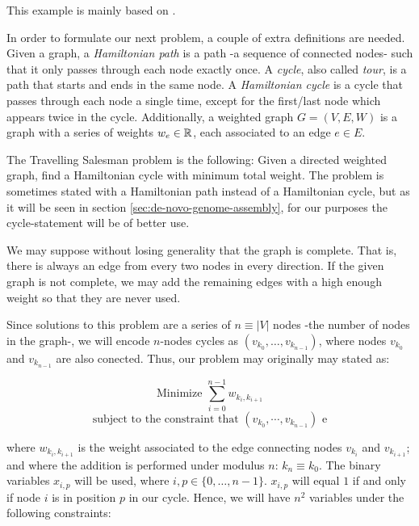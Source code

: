This example is mainly based on \cite{Glover2019}.

In order to formulate our next problem, a couple of extra definitions are needed. Given a graph, a \emph{Hamiltonian path} is a path -a sequence of connected nodes- such that it only passes through each node exactly once. A \emph{cycle}, also called \emph{tour}, is a path that starts and ends in the same node. A \emph{Hamiltonian cycle} is a cycle that passes through each node a single time, except for the first/last node which appears twice in the cycle. Additionally, a weighted graph $G =(V, E, W)$ is a graph with a series of weights $w_e \in \mathbb{R}$, each associated to an edge $e \in E$.

The Travelling Salesman problem is the following: Given a directed weighted graph, find a Hamiltonian cycle with minimum total weight. The problem is sometimes stated with a Hamiltonian path instead of a Hamiltonian cycle, but as it will be seen in section \ref{sec:de-novo-genome-assembly}, for our purposes the cycle-statement will be of better use.

We may suppose without losing generality that the graph is complete. That is, there is always an edge from every two nodes in every direction. If the given graph is not complete, we may add the remaining edges with a high enough weight so that they are never used.

Since solutions to this problem are a series of $n \equiv |V|$ nodes -the number of nodes in the graph-, we will encode $n$-nodes cycles as $(v_{k_0}, \ldots, v_{k_{n-1}})$, where nodes $v_{k_0}$ and $v_{k_{n-1}}$ are also conected. Thus, our problem may originally may stated as:

$$ \text{Minimize } \sum_{i=0}^{n-1} w_{k_i, k_{i+1}} $$
$$ \text{subject to the constraint that } (v_{k_0}, \cdots, v_{k_{n-1}}) \text{ e}$$

where $w_{k_i, k_{i+1}}$ is the weight associated to the edge connecting nodes $v_{k_i}$ and $v_{k_{i+1}}$; and where the addition is performed under modulus $n$: $k_n \equiv k_0$. The binary variables $x_{i,p}$ will be used, where $i,p \in \{0, \ldots, n-1\}$. $x_{i,p}$ will equal $1$ if and only if node $i$ is in position $p$ in our cycle. Hence, we will have $n^2$ variables under the following constraints:

